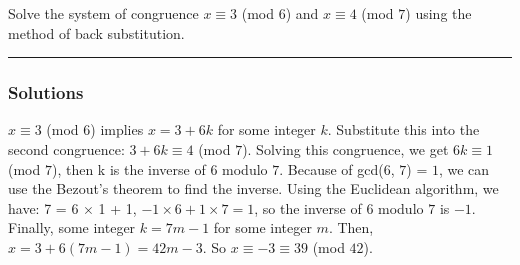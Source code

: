 \newpage
\begin{question}
Solve the system of congruence $x \equiv 3$ (mod $6$) and
$x \equiv 4$ (mod $7$) using the method of back substitution.
\end{question}

\par\noindent\rule{\textwidth}{0.5pt}

\subsubsection*{Solutions}
\indent\indent
$x \equiv 3$ (mod $6$) implies $x = 3 + 6k$ for some integer $k$.
Substitute this into the second congruence: $3 + 6k \equiv 4$ (mod $7$).
Solving this congruence, we get $6k \equiv 1$ (mod $7$), then k is the inverse of $6$ modulo $7$. Because of gcd($6$, $7$) = $1$, we can use the Bezout's theorem to find the inverse. Using the Euclidean algorithm, we have: 7 = 6 $\times$ 1 + 1,  $-1 \times 6 + 1 \times 7 = 1$, so the inverse of $6$ modulo $7$ is $-1$. Finally, some integer $k = 7m - 1$ for some integer $m$. Then, $x = 3 + 6(7m - 1) = 42m - 3$. So $x \equiv -3 \equiv 39$ (mod $42$).